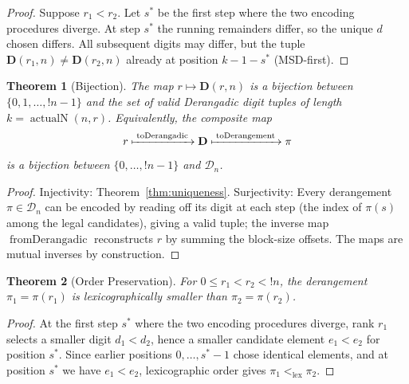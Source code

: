 \documentclass[11pt,a4paper]{article}
\newtheorem{theorem}{Theorem}[section]
\newcommand{\subfact}[1]{!{#1}} %
\newcommand{\actualN}{\operatorname{actualN}}
\newcommand{\lexlt}{<_{\text{lex}}}
\begin{document}
    \begin{proof}
        Suppose $r_1 < r_2$. Let $s^*$ be the first step where the two encoding
        procedures diverge. At step $s^*$ the running remainders differ, so the
        unique $d$ chosen differs. All subsequent digits may differ, but the
        tuple $\mathbf{D}(r_1,n) \neq \mathbf{D}(r_2,n)$ already at position
        $k-1-s^*$ (MSD-first).
    \end{proof}

    \begin{theorem}[Bijection]
        \label{thm:bijection}
        The map $r \mapsto \mathbf{D}(r,n)$ is a bijection between
        $\{0,1,\dots,\subfact{n}-1\}$ and the set of valid Derangadic digit tuples
        of length $k = \actualN(n,r)$. Equivalently, the composite map
        \[
            r \xmapsto{\;\operatorname{toDerangadic}\;} \mathbf{D}
            \xmapsto{\;\operatorname{toDerangement}\;} \pi
        \]
        is a bijection between $\{0,\dots,\subfact{n}-1\}$ and $\mathcal{D}_n$.
    \end{theorem}

    \begin{proof}
        Injectivity: Theorem~\ref{thm:uniqueness}. Surjectivity: Every derangement
        $\pi \in \mathcal{D}_n$ can be encoded by reading off its digit at each step
        (the index of $\pi(s)$ among the legal candidates), giving a valid tuple;
        the inverse map $\operatorname{fromDerangadic}$ reconstructs $r$ by summing
        the block-size offsets. The maps are mutual inverses by construction.
    \end{proof}

    \begin{theorem}[Order Preservation]
        \label{thm:order}
        For $0 \leq r_1 < r_2 < \subfact{n}$, the derangement $\pi_1 = \pi(r_1)$ is
        lexicographically smaller than $\pi_2 = \pi(r_2)$.
    \end{theorem}

    \begin{proof}
        At the first step $s^*$ where the two encoding procedures diverge, rank
        $r_1$ selects a smaller digit $d_1 < d_2$, hence a smaller candidate element
        $e_1 < e_2$ for position $s^*$. Since earlier positions $0,\dots,s^*-1$
        chose identical elements, and at position $s^*$ we have $e_1 < e_2$,
        lexicographic order gives $\pi_1 \lexlt \pi_2$.
    \end{proof}

\end{document}
